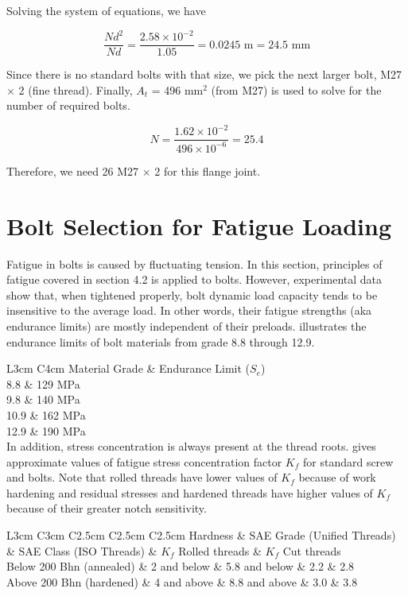\documentclass[a4paper,openany,12pt]{book}
\begin{document}
{{Solving the system of equations, we have

$$\frac{Nd^2}{Nd} = \frac{2.58 \times 10^{-2}}{1.05} = 0.0245 \text{ m} = 24.5 \text{ mm}$$

Since there is no standard bolts with that size, we pick the next larger
bolt, M27 \(\times\) 2 (fine thread). Finally, \(A_t\) = 496 mm\(^2\) (from
M27) is used to solve for the number of required bolts.

$$N = \frac{1.62 \times 10^{-2}}{496 \times 10^{-6}} = 25.4$$

Therefore, we need 26 M27 \(\times\) 2 for this flange joint.

\section{Bolt Selection for Fatigue Loading}
\label{bolt-selection-for-fatigue-loading}
Fatigue in bolts is caused by fluctuating tension. In this section,
principles of fatigue covered in section 4.2 is applied to bolts.
However, experimental data show that, when tightened properly, bolt
dynamic load capacity tends to be insensitive to the average load. In
other words, their fatigue strengths (aka endurance limits) are mostly
independent of their preloads. illustrates the endurance limits of bolt
materials from grade 8.8 through 12.9.


 L3cm C4cm Material Grade \& Endurance Limit (\(S_e\))\\
8.8 \& 129 MPa\\
9.8 \& 140 MPa\\
10.9 \& 162 MPa\\
12.9 \& 190 MPa\\

In addition, stress concentration is always present at the thread roots.
gives approximate values of fatigue stress concentration factor \(K_f\)
for standard screw and bolts. Note that rolled threads have lower values
of \(K_f\) because of work hardening and residual stresses and hardened
threads have higher values of \(K_f\) because of their greater notch
sensitivity.

 L3cm C3cm C2.5cm C2.5cm C2.5cm Hardness \& SAE Grade (Unified Threads) \&
SAE Class (ISO Threads) \& \(K_f\) Rolled threads \& \(K_f\) Cut threads\\
Below 200 Bhn (annealed) \& 2 and below \& 5.8 and below \& 2.2 \& 2.8\\
Above 200 Bhn (hardened) \& 4 and above \& 8.8 and above \& 3.0 \& 3.8\\

}}
\end{document}
